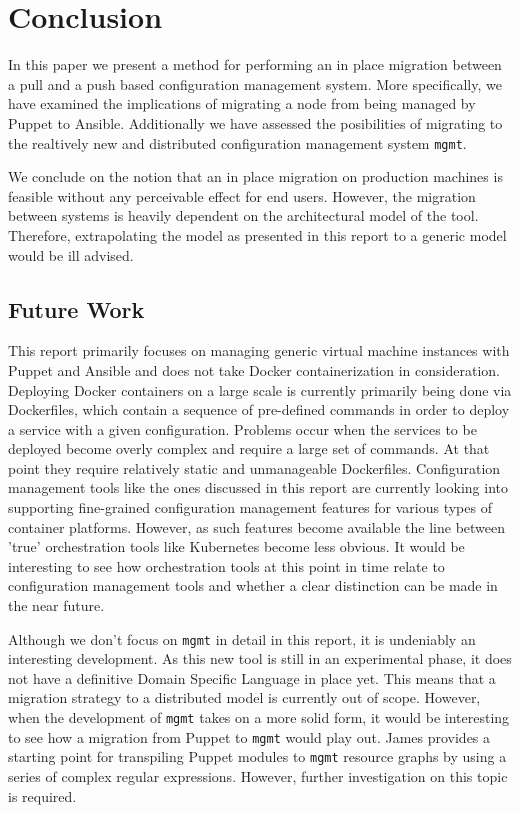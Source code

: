 \section{Conclusion}\label{sec:conclusion}
In this paper we present a method for performing an in place migration between a pull and a push based configuration management system. More specifically, we have examined the implications of migrating a node from being managed by Puppet to Ansible. Additionally we have assessed the posibilities of migrating to the realtively new and distributed configuration management system \texttt{mgmt}. 


We conclude on the notion that an in place migration on production machines is feasible without any perceivable effect for end users. However, the migration between systems is heavily dependent on the architectural model of the tool. Therefore, extrapolating the model as presented in this report to a generic model would be ill advised. 


\subsection{Future Work}\label{subsec:futurework}
This report primarily focuses on managing generic virtual machine instances with Puppet and Ansible and does not take Docker containerization in consideration. Deploying Docker containers on a large scale is currently primarily being done via Dockerfiles, which contain a sequence of pre-defined commands in order to deploy a service with a given configuration. Problems occur when the services to be deployed become overly complex and require a large set of commands. At that point they require relatively static and unmanageable Dockerfiles. Configuration management tools like the ones discussed in this report are currently looking into supporting fine-grained configuration management features for various types of container platforms. However, as such features become available the line between 'true' orchestration tools like Kubernetes \cite{kubernetes_2016} become less obvious. It would be interesting to see how orchestration tools at this point in time relate to configuration management tools and whether a clear distinction can be made in the near future.

Although we don't focus on \texttt{mgmt} in detail in this report, it is undeniably an interesting development. As this new tool is still in an experimental phase, it does not have a definitive Domain Specific Language in place yet. This means that a migration strategy to a distributed model is currently out of scope. However, when the development of \texttt{mgmt} takes on a more solid form, it would be interesting to see how a migration from Puppet to \texttt{mgmt} would play out. James \cite{frank_2016} provides a starting point for transpiling Puppet modules to \texttt{mgmt} resource graphs by using a series of complex regular expressions. However, further investigation on this topic is required.
